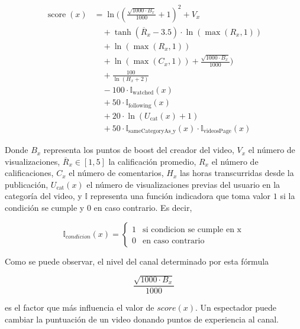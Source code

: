 \begin{equation}
\label{eq:recommendation-score}
\begin{aligned}
\operatorname{score}(x)
&=
\ln\Bigg(
\left(
\frac{\sqrt{1000 \cdot B_x}}{1000} + 1
\right)^2
+ V_x \\[2mm]
&\quad
+ \tanh(\overline{R}_x - 3.5)
\cdot \ln\left(\max(R_x,1)\right)\\[2mm]
&\quad
+ \ln\left(\max(R_x,1)\right) \\[2mm]
&\quad
+ \ln\left(\max(C_x,1)\right)
+ \frac{\sqrt{1000 \cdot B_x}}{1000}
\Bigg) \\[2mm]
&\quad
+ \frac{100}{\ln\left(H_x + 2\right)} \\[2mm]
&\quad
- 100 \cdot \mathbb{I}_{\mathrm{watched}}(x) \\[2mm]
&\quad
+ 50 \cdot \mathbb{I}_{\mathrm{following}}(x) \\[2mm]
&\quad
+ 20 \cdot \ln\left(U_{\operatorname{cat}}(x)+ 1\right) \\[2mm]
&\quad
+ 50 \cdot \mathbb{I}_{\mathrm{sameCategoryAs\_y}}(x)
\cdot \mathbb{I}_{\mathrm{videosPage}}(x)
\end{aligned}
\end{equation}

\noindent
Donde $B_x$ representa los puntos de boost del creador del video,
$V_x$ el número de visualizaciones,
$\overline{R}_x \in [1,5]$ la calificación promedio,
$R_x$ el número de calificaciones,
$C_x$ el número de comentarios,
$H_x$ las horas transcurridas desde la publicación,
$U_{\operatorname{cat}}(x)$ el número de visualizaciones previas del usuario en la categoría del video,
y $\mathbb{I}$ representa una función indicadora que toma valor $1$ si la condición se cumple y $0$ en caso contrario. Es decir,
 
\begin{equation}
    \mathbb{I}_{condicion}(x) = 
\begin{cases} 
1 & \text{si condicion se cumple en x} \\ 
0 & \text{en caso contrario} 
\end{cases}
\end{equation}

Como se puede observar, el nivel del canal determinado por esta fórmula 

\begin{equation}
    \frac{\sqrt{1000 \cdot B_x}}{1000}
\end{equation}

es el factor que más influencia el valor de $score(x)$. Un espectador puede cambiar la puntuación de un video donando puntos de experiencia al canal.

